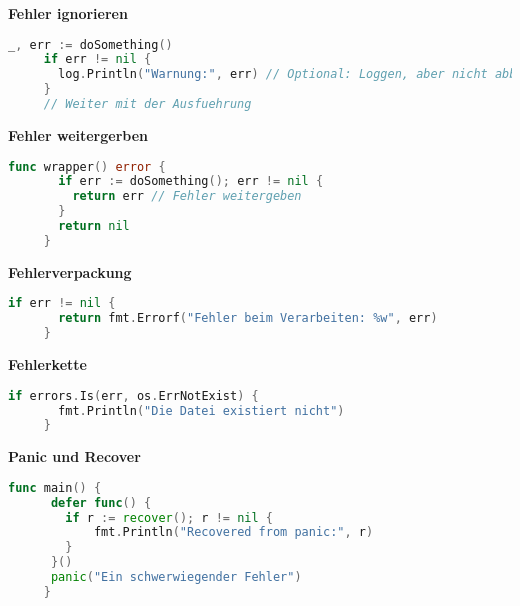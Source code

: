 \documentclass[twoside,a4paper,12pt]{article}
\begin{document}
\newpage
\textbf{Fehler ignorieren}
\begin{center}
  \begin{minipage}{1.0\textwidth}
    \begin{lstlisting}[language=Go]
     _, err := doSomething()
     if err != nil {
       log.Println("Warnung:", err) // Optional: Loggen, aber nicht abbrechen
     }
     // Weiter mit der Ausfuehrung    
    \end{lstlisting}
  \end{minipage}
\end{center}

\textbf{Fehler weitergerben}
\begin{center}
  \begin{minipage}{1.0\textwidth}
    \begin{lstlisting}[language=Go]
     func wrapper() error {
       if err := doSomething(); err != nil {
         return err // Fehler weitergeben
       }
       return nil
     }
    \end{lstlisting}
  \end{minipage}
\end{center}

\textbf{Fehlerverpackung}
\begin{center}
  \begin{minipage}{1.0\textwidth}
    \begin{lstlisting}[language=Go]
     if err != nil {
       return fmt.Errorf("Fehler beim Verarbeiten: %w", err)
     }
    \end{lstlisting}
  \end{minipage}
\end{center}

\textbf{Fehlerkette}
\begin{center}
  \begin{minipage}{1.0\textwidth}
    \begin{lstlisting}[language=Go]
     if errors.Is(err, os.ErrNotExist) {
       fmt.Println("Die Datei existiert nicht")
     }
    \end{lstlisting}
  \end{minipage}
\end{center}

\textbf{Panic und Recover}
\begin{center}
  \begin{minipage}{1.0\textwidth}
    \begin{lstlisting}[language=Go]
     func main() {
      defer func() {
        if r := recover(); r != nil {
            fmt.Println("Recovered from panic:", r)
        }
      }()
      panic("Ein schwerwiegender Fehler")
     }
    \end{lstlisting}
  \end{minipage}
\end{center}
\end{document}
